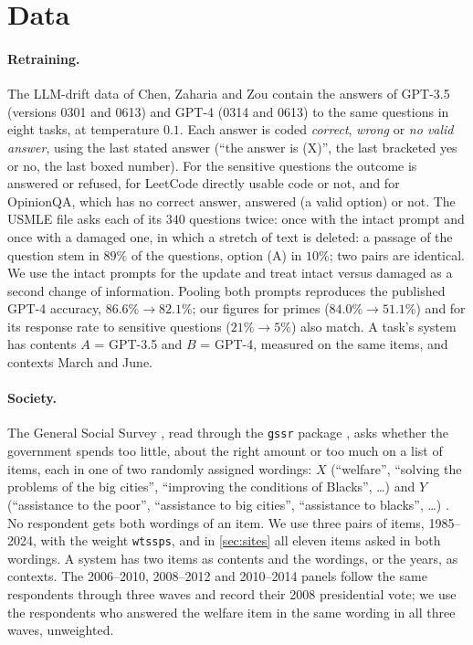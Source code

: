 \documentclass[11pt]{article}
\theoremstyle{definition}
\theoremstyle{remark}
\begin{document}
\section{Data}\label{sec:data}

\paragraph{Retraining.} The LLM-drift data of Chen, Zaharia and Zou \cite{ChenZaharia2024} contain the answers of GPT-3.5 (versions 0301 and
0613) and GPT-4 (0314 and 0613) to the same questions in eight tasks, at temperature $0.1$. Each answer is coded \emph{correct},
\emph{wrong} or \emph{no valid answer}, using the last stated answer (``the answer is (X)'', the last bracketed yes or no, the last boxed
number). For the sensitive questions the outcome is answered or refused, for LeetCode directly usable code or not, and for OpinionQA,
which has no correct answer, answered (a valid option) or not. The USMLE file asks each of its $340$ questions twice: once with the intact
prompt and once with a damaged one, in which a stretch of text is deleted: a passage of the question stem in $89\%$ of the questions,
option (A) in $10\%$; two pairs are identical. We use the intact prompts for the update and treat intact versus damaged as a second change of information.
Pooling both prompts reproduces the published GPT-4 accuracy, $86.6\%\to82.1\%$; our figures for primes ($84.0\%\to51.1\%$) and for its
response rate to sensitive questions ($21\%\to5\%$) also match. A task's system has contents $A$ = GPT-3.5 and $B$ = GPT-4, measured on
the same items, and contexts March and June.

\paragraph{Society.} The General Social Survey \cite{GSS}, read through the \texttt{gssr} package \cite{Healy2024}, asks whether the
government spends too little, about the right amount or too much on a list of items, each in one of two randomly assigned wordings: $X$
(``welfare'', ``solving the problems of the big cities'', ``improving the conditions of Blacks'', \dots) and $Y$ (``assistance to the poor'',
``assistance to big cities'', ``assistance to blacks'', \dots) \cite{Smith1987,HuberParis2013}. No respondent gets both wordings of an item.
We use three pairs of items, 1985--2024, with the weight \texttt{wtssps}, and in \cref{sec:sites} all eleven items asked in both wordings. A system has two items as contents and the wordings, or the
years, as contexts. The 2006--2010, 2008--2012 and 2010--2014 panels follow the same respondents through three waves and record their 2008
presidential vote; we use the respondents who answered the welfare item in the same wording in all three waves, unweighted.
\end{document}
